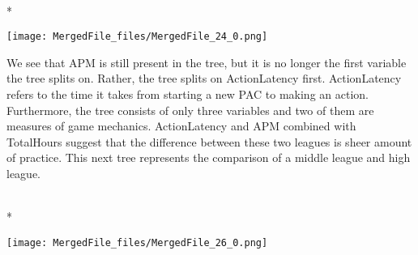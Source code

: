 \documentclass[letterpaper,10pt,english]{/usr/share/sphinx/texinputs/sphinxhowto}
\def\smaller{\fontsize{9.5pt}{9.5pt}\selectfont}
\newenvironment{InvisibleVerbatim}
        {\begin{mdframed}[leftmargin=0.1\linewidth,innerleftmargin=3pt,innerrightmargin=3pt, userdefinedwidth=1\linewidth, linewidth=0pt, linecolor=white, usetwoside=false]}
        {\end{mdframed}}
\begin{document}
    

        
        

            
                \makebox[0.1\linewidth]{\smaller\hfill\tt\color{nbframe-out-prompt}Out\hspace{4pt}{[}22{]}:\hspace{4pt}}\\*
                \vspace{-2.55\baselineskip}\begin{InvisibleVerbatim}
                \vspace{-0.5\baselineskip}
    \begin{center}
    \texttt{[image: MergedFile\_files/MergedFile\_24\_0.png]}
    \par
    \end{center}
    
            \end{InvisibleVerbatim}
            
        
    
We see that APM is still present in the tree, but it is no longer the
first variable the tree splits on. Rather, the tree splits on
ActionLatency first. ActionLatency refers to the time it takes from
starting a new PAC to making an action. Furthermore, the tree consists
of only three variables and two of them are measures of game mechanics.
ActionLatency and APM combined with TotalHours suggest that the
difference between these two leagues is sheer amount of practice.
\newpage
This next tree represents the comparison of a middle league and high
league.

    

        
        

            
                \makebox[0.1\linewidth]{\smaller\hfill\tt\color{nbframe-out-prompt}Out\hspace{4pt}{[}21{]}:\hspace{4pt}}\\*
                \vspace{-2.55\baselineskip}\begin{InvisibleVerbatim}
                \vspace{-0.5\baselineskip}
    \begin{center}
    \texttt{[image: MergedFile\_files/MergedFile\_26\_0.png]}
    \par
    \end{center}
    
            \end{InvisibleVerbatim}
            
\end{document}
